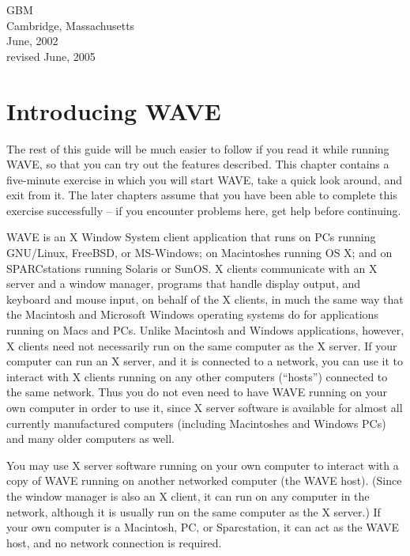 \documentclass[twoside]{book}
\newcommand{\WAVE}{{\sf WAVE}\xspace}
\begin{document}
\vspace{2em}
\noindent
GBM\\
Cambridge, Massachusetts\\
June, 2002\\
revised June, 2005

\chapter{Introducing \WAVE{}}

The rest of this guide will be much easier to follow if you read it
while running \WAVE{}, so that you can try out the features
described.  This chapter contains a five-minute exercise in which you
will start \WAVE{}, take a quick look around, and exit from it.
The later chapters assume that you have been able to complete this
exercise successfully -- if you encounter problems here, get help
before continuing.

\vspace{5mm}


\WAVE{} is an X Window System client application that runs on PCs
running GNU/Linux, FreeBSD, or MS-Windows;  on Macintoshes running OS
X;  and on SPARCstations running Solaris or SunOS.  X
clients communicate with an X server and a window manager, programs
that handle display output, and keyboard and mouse input, on behalf
of the X clients, in much the same way that the Macintosh and
Microsoft Windows operating systems do for applications running on
Macs and PCs.  Unlike Macintosh and Windows applications, however, X
clients need not necessarily run on the same computer as the X server.
If your computer can run an X server, and it is connected to a
network, you can use it to interact with X clients running on any
other computers (``hosts'') connected to the same network.  Thus you
do not even need to have \WAVE{} running on your own computer in order
to use it, since X server software is available for almost all
currently manufactured computers (including Macintoshes and Windows
PCs) and many older computers as well.

\index{WAVE host@\WAVE{} host}
You may use X server software running on your own computer to interact
with a copy of \WAVE{} running on another networked computer (the
\WAVE{} host).  (Since the window manager is also an X client, it can run on
any computer in the network, although it is usually run on the same computer
as the X server.)   If your own computer is a Macintosh, PC, or Sparcstation,
it can act as the \WAVE{} host, and no network connection is required.
\end{document}
